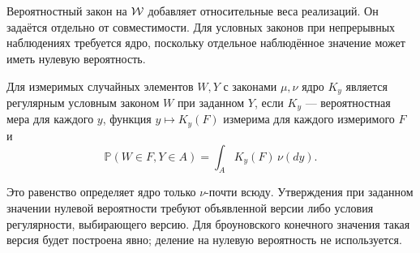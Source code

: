 \section{}
\label{sec:gaussian}
{Вероятностный закон на $\mathcal W$ добавляет относительные веса реализаций. Он задаётся отдельно от совместимости. Для условных законов при непрерывных наблюдениях требуется ядро, поскольку отдельное наблюдённое значение может иметь нулевую вероятность.}
\begin{definition}
\label{def:rcd}
{Для измеримых случайных элементов $W,Y$ с законами $\mu,\nu$ ядро $K_y$ является регулярным условным законом $W$ при заданном $Y$, если $K_y$ --- вероятностная мера для каждого $y$, функция $y\mapsto K_y(F)$ измерима для каждого измеримого $F$ и}
\begin{equation}\label{eq:disintegration}
\mathbb P(W\in F,Y\in A)=\int_A K_y(F)\,\nu(dy).
\end{equation}
\end{definition}
{Это равенство определяет ядро только $\nu$-почти всюду. Утверждения при заданном значении нулевой вероятности требуют объявленной версии либо условия регулярности, выбирающего версию. Для броуновского конечного значения такая версия будет построена явно; деление на нулевую вероятность не используется.}

